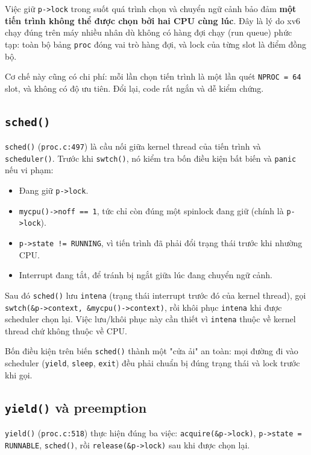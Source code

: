 Việc giữ \texttt{p->lock} trong suốt quá trình chọn và chuyển ngữ cảnh bảo đảm \textbf{một tiến trình không thể được chọn bởi hai CPU cùng lúc}. Đây là lý do xv6 chạy đúng trên máy nhiều nhân dù không có hàng đợi chạy (run queue) phức tạp: toàn bộ bảng \texttt{proc} đóng vai trò hàng đợi, và lock của từng slot là điểm đồng bộ.

Cơ chế này cũng có chi phí: mỗi lần chọn tiến trình là một lần quét \texttt{NPROC = 64} slot, và không có độ ưu tiên. Đổi lại, code rất ngắn và dễ kiểm chứng.

\subsection{\texttt{sched()}}

\texttt{sched()} (\texttt{proc.c:497}) là cầu nối giữa kernel thread của tiến trình và \texttt{scheduler()}. Trước khi \texttt{swtch()}, nó kiểm tra bốn điều kiện bất biến và \texttt{panic} nếu vi phạm:

\begin{itemize}[itemsep=0pt, topsep=2.5pt, leftmargin=1.5cm]
    \item Đang giữ \texttt{p->lock}.
    \item \texttt{mycpu()->noff == 1}, tức chỉ còn đúng một spinlock đang giữ (chính là \texttt{p->lock}).
    \item \texttt{p->state != RUNNING}, vì tiến trình đã phải đổi trạng thái trước khi nhường CPU.
    \item Interrupt đang tắt, để tránh bị ngắt giữa lúc đang chuyển ngữ cảnh.
\end{itemize}

Sau đó \texttt{sched()} lưu \texttt{intena} (trạng thái interrupt trước đó của kernel thread), gọi \texttt{swtch(\&p->context, \&mycpu()->context)}, rồi khôi phục \texttt{intena} khi được scheduler chọn lại. Việc lưu/khôi phục này cần thiết vì \texttt{intena} thuộc về kernel thread chứ không thuộc về CPU.

Bốn điều kiện trên biến \texttt{sched()} thành một "cửa ải" an toàn: mọi đường đi vào scheduler (\texttt{yield}, \texttt{sleep}, \texttt{exit}) đều phải chuẩn bị đúng trạng thái và lock trước khi gọi.

\subsection{\texttt{yield()} và preemption}

\texttt{yield()} (\texttt{proc.c:518}) thực hiện đúng ba việc: \texttt{acquire(\&p->lock)}, \texttt{p->state = RUNNABLE}, \texttt{sched()}, rồi \texttt{release(\&p->lock)} sau khi được chọn lại.

